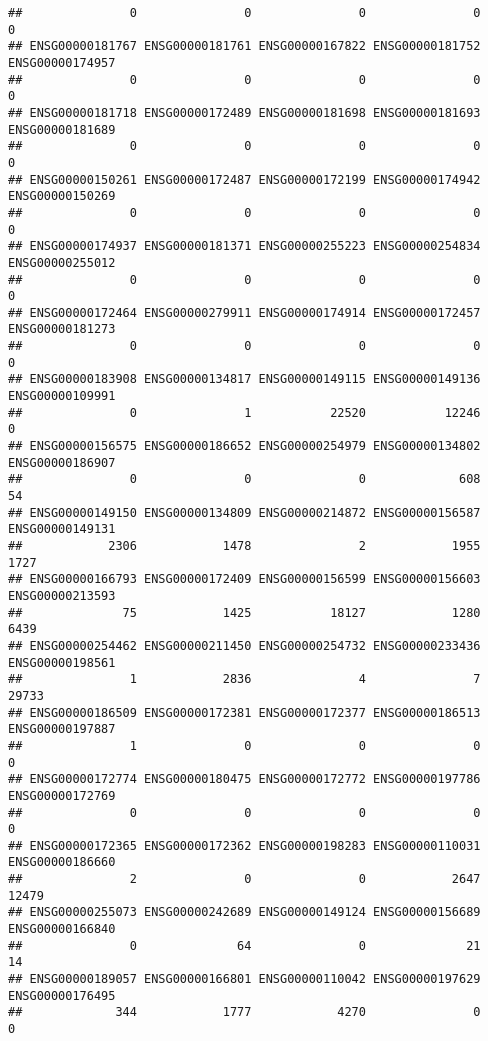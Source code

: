 \documentclass[
]{article}
\begin{document}
\begin{verbatim}
##               0               0               0               0               0 
## ENSG00000181767 ENSG00000181761 ENSG00000167822 ENSG00000181752 ENSG00000174957 
##               0               0               0               0               0 
## ENSG00000181718 ENSG00000172489 ENSG00000181698 ENSG00000181693 ENSG00000181689 
##               0               0               0               0               0 
## ENSG00000150261 ENSG00000172487 ENSG00000172199 ENSG00000174942 ENSG00000150269 
##               0               0               0               0               0 
## ENSG00000174937 ENSG00000181371 ENSG00000255223 ENSG00000254834 ENSG00000255012 
##               0               0               0               0               0 
## ENSG00000172464 ENSG00000279911 ENSG00000174914 ENSG00000172457 ENSG00000181273 
##               0               0               0               0               0 
## ENSG00000183908 ENSG00000134817 ENSG00000149115 ENSG00000149136 ENSG00000109991 
##               0               1           22520           12246               0 
## ENSG00000156575 ENSG00000186652 ENSG00000254979 ENSG00000134802 ENSG00000186907 
##               0               0               0             608              54 
## ENSG00000149150 ENSG00000134809 ENSG00000214872 ENSG00000156587 ENSG00000149131 
##            2306            1478               2            1955            1727 
## ENSG00000166793 ENSG00000172409 ENSG00000156599 ENSG00000156603 ENSG00000213593 
##              75            1425           18127            1280            6439 
## ENSG00000254462 ENSG00000211450 ENSG00000254732 ENSG00000233436 ENSG00000198561 
##               1            2836               4               7           29733 
## ENSG00000186509 ENSG00000172381 ENSG00000172377 ENSG00000186513 ENSG00000197887 
##               1               0               0               0               0 
## ENSG00000172774 ENSG00000180475 ENSG00000172772 ENSG00000197786 ENSG00000172769 
##               0               0               0               0               0 
## ENSG00000172365 ENSG00000172362 ENSG00000198283 ENSG00000110031 ENSG00000186660 
##               2               0               0            2647           12479 
## ENSG00000255073 ENSG00000242689 ENSG00000149124 ENSG00000156689 ENSG00000166840 
##               0              64               0              21              14 
## ENSG00000189057 ENSG00000166801 ENSG00000110042 ENSG00000197629 ENSG00000176495 
##             344            1777            4270               0               0 

\end{verbatim}
\end{document}
